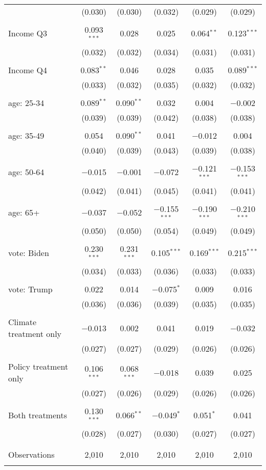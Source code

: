 \begin{tabular}{@{\extracolsep{5pt}}lccccc}
  & (0.030) & (0.030) & (0.032) & (0.029) & (0.029) \\ 
  & & & & & \\ 
 Income Q3 & 0.093$^{***}$ & 0.028 & 0.025 & 0.064$^{**}$ & 0.123$^{***}$ \\ 
  & (0.032) & (0.032) & (0.034) & (0.031) & (0.031) \\ 
  & & & & & \\ 
 Income Q4 & 0.083$^{**}$ & 0.046 & 0.028 & 0.035 & 0.089$^{***}$ \\ 
  & (0.033) & (0.032) & (0.035) & (0.032) & (0.032) \\ 
  & & & & & \\ 
 age: 25-34 & 0.089$^{**}$ & 0.090$^{**}$ & 0.032 & 0.004 & $-$0.002 \\ 
  & (0.039) & (0.039) & (0.042) & (0.038) & (0.038) \\ 
  & & & & & \\ 
 age: 35-49 & 0.054 & 0.090$^{**}$ & 0.041 & $-$0.012 & 0.004 \\ 
  & (0.040) & (0.039) & (0.043) & (0.039) & (0.038) \\ 
  & & & & & \\ 
 age: 50-64 & $-$0.015 & $-$0.001 & $-$0.072 & $-$0.121$^{***}$ & $-$0.153$^{***}$ \\ 
  & (0.042) & (0.041) & (0.045) & (0.041) & (0.041) \\ 
  & & & & & \\ 
 age: 65+ & $-$0.037 & $-$0.052 & $-$0.155$^{***}$ & $-$0.190$^{***}$ & $-$0.210$^{***}$ \\ 
  & (0.050) & (0.050) & (0.054) & (0.049) & (0.049) \\ 
  & & & & & \\ 
 vote: Biden & 0.230$^{***}$ & 0.231$^{***}$ & 0.105$^{***}$ & 0.169$^{***}$ & 0.215$^{***}$ \\ 
  & (0.034) & (0.033) & (0.036) & (0.033) & (0.033) \\ 
  & & & & & \\ 
 vote: Trump & 0.022 & 0.014 & $-$0.075$^{*}$ & 0.009 & 0.016 \\ 
  & (0.036) & (0.036) & (0.039) & (0.035) & (0.035) \\ 
  & & & & & \\ 
 Climate treatment only & $-$0.013 & 0.002 & 0.041 & 0.019 & $-$0.032 \\ 
  & (0.027) & (0.027) & (0.029) & (0.026) & (0.026) \\ 
  & & & & & \\ 
 Policy treatment only & 0.106$^{***}$ & 0.068$^{***}$ & $-$0.018 & 0.039 & 0.025 \\ 
  & (0.027) & (0.026) & (0.029) & (0.026) & (0.026) \\ 
  & & & & & \\ 
 Both treatments & 0.130$^{***}$ & 0.066$^{**}$ & $-$0.049$^{*}$ & 0.051$^{*}$ & 0.041 \\ 
  & (0.028) & (0.027) & (0.030) & (0.027) & (0.027) \\ 
  & & & & & \\ 
\hline \\[-1.8ex] 

Observations & 2,010 & 2,010 & 2,010 & 2,010 & 2,010 \\ 
\hline 
\hline \\[-1.8ex] 
\end{tabular} 